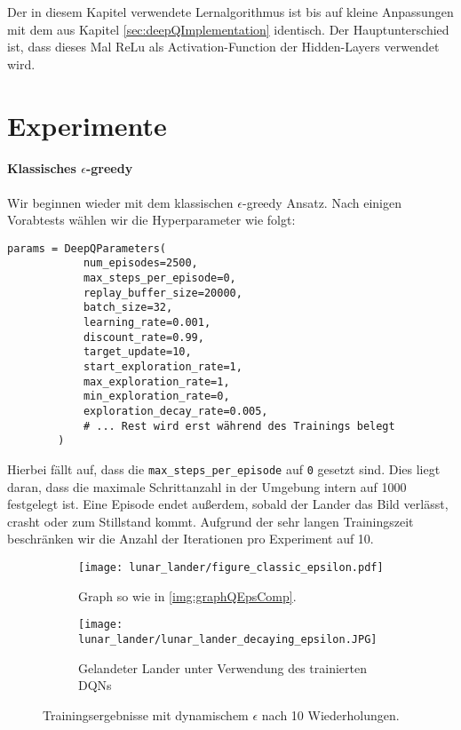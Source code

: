 Der in diesem Kapitel verwendete Lernalgorithmus ist bis auf kleine Anpassungen mit dem aus Kapitel \ref{sec:deepQImplementation} identisch. Der Hauptunterschied ist, dass dieses Mal ReLu als Activation-Function der Hidden-Layers verwendet wird.

\section{Experimente}
\paragraph{Klassisches $ \epsilon $-greedy}
Wir beginnen wieder mit dem klassischen $ \epsilon $-greedy Ansatz. Nach einigen Vorabtests wählen wir die Hyperparameter wie folgt:
\begin{verbatim}
params = DeepQParameters(
            num_episodes=2500,
            max_steps_per_episode=0,
            replay_buffer_size=20000,
            batch_size=32,
            learning_rate=0.001,
            discount_rate=0.99,
            target_update=10,
            start_exploration_rate=1,
            max_exploration_rate=1,
            min_exploration_rate=0,
            exploration_decay_rate=0.005,
            # ... Rest wird erst während des Trainings belegt
        )
\end{verbatim}
Hierbei fällt auf, dass die \texttt{max_steps_per_episode} auf \texttt{0} gesetzt sind. Dies liegt daran, dass die maximale Schrittanzahl in der Umgebung intern auf 1000 festgelegt ist. Eine Episode endet außerdem, sobald der Lander das Bild verlässt, crasht oder zum Stillstand kommt. Aufgrund der sehr langen Trainingszeit beschränken wir die Anzahl der Iterationen pro Experiment auf 10.

\begin{figure}[h!]
    \centering
    \begin{subfigure}[b]{0.7\textwidth}
        \texttt{[image: lunar\_lander/figure\_classic\_epsilon.pdf]}
        \caption{Graph so wie in \ref{img:graphQEpsComp}.}
        \label{img:lunarClassicEps01Graph}
    \end{subfigure}
    \begin{subfigure}[b]{0.5\textwidth}
        \texttt{[image: lunar\_lander/lunar\_lander\_decaying\_epsilon.JPG]}
        \caption{Gelandeter Lander unter Verwendung des trainierten DQNs}
        \label{img:lunarClassicEps01Env}
    \end{subfigure}
    \caption{Trainingsergebnisse mit dynamischem $ \epsilon $ nach 10 Wiederholungen.} \label{img:lunarClassicEps01}
\end{figure}

